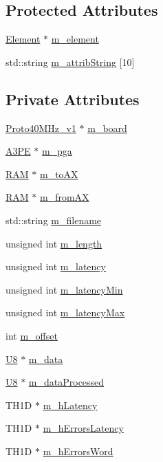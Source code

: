 \subsection*{Protected Attributes}
\begin{DoxyCompactItemize}
\item 
\hyperlink{classElement}{Element} $\ast$ \hyperlink{classProcessus_aa9d24d53c3e52f36786cabb5d8e296e7}{m\_\-element}
\item 
std::string \hyperlink{classAttrib_a3414521d7a82476e874b25a5407b5e63}{m\_\-attribString} \mbox{[}10\mbox{]}
\end{DoxyCompactItemize}
\subsection*{Private Attributes}
\begin{DoxyCompactItemize}
\item 
\hyperlink{classProto40MHz__v1}{Proto40MHz\_\-v1} $\ast$ \hyperlink{classA3PE__BitFlip_a2ade653b4fda5f531b5de28233cdb749}{m\_\-board}
\item 
\hyperlink{classA3PE}{A3PE} $\ast$ \hyperlink{classA3PE__BitFlip_ad20d7abccf27fa87b931cb77cd6b5e41}{m\_\-pga}
\item 
\hyperlink{classRAM}{RAM} $\ast$ \hyperlink{classA3PE__BitFlip_a0ac416167c83d423cda4e09a892b5255}{m\_\-toAX}
\item 
\hyperlink{classRAM}{RAM} $\ast$ \hyperlink{classA3PE__BitFlip_aad9a62adac072bed5de87406ce4cd77d}{m\_\-fromAX}
\item 
std::string \hyperlink{classA3PE__BitFlip_a72eecaff11d66c7f3eee10a9b2bfa301}{m\_\-filename}
\item 
unsigned int \hyperlink{classA3PE__BitFlip_aba0564f2bb8a8ab549da428171d6a3d6}{m\_\-length}
\item 
unsigned int \hyperlink{classA3PE__BitFlip_a6f5ad1d6595e98c2fbd58f43e2754322}{m\_\-latency}
\item 
unsigned int \hyperlink{classA3PE__BitFlip_aeae11ece90351542cae8e0590d9162ee}{m\_\-latencyMin}
\item 
unsigned int \hyperlink{classA3PE__BitFlip_adfeac5a7ab09d89f0d0146113dd55dde}{m\_\-latencyMax}
\item 
int \hyperlink{classA3PE__BitFlip_ac0797dd65b1aeab96647d795e2f1a447}{m\_\-offset}
\item 
\hyperlink{classA3PE__BitFlip_ac561e6bbd8d4101ecc32016314a07581}{U8} $\ast$ \hyperlink{classA3PE__BitFlip_a06e7c01e11710261168bb0e12e2e4ac5}{m\_\-data}
\item 
\hyperlink{classA3PE__BitFlip_ac561e6bbd8d4101ecc32016314a07581}{U8} $\ast$ \hyperlink{classA3PE__BitFlip_a5e64d319904fc8a6fe70b92afcf6ef4f}{m\_\-dataProcessed}
\item 
TH1D $\ast$ \hyperlink{classA3PE__BitFlip_a83928ea28c555c19f4e95cf7863c1b0c}{m\_\-hLatency}
\item 
TH1D $\ast$ \hyperlink{classA3PE__BitFlip_a4dec854e8123271c9a624ca46c50dfd5}{m\_\-hErrorsLatency}
\item 
TH1D $\ast$ \hyperlink{classA3PE__BitFlip_a0d9ea71af465c060689be4c05cba9a8e}{m\_\-hErrorsWord}
\end{DoxyCompactItemize}


